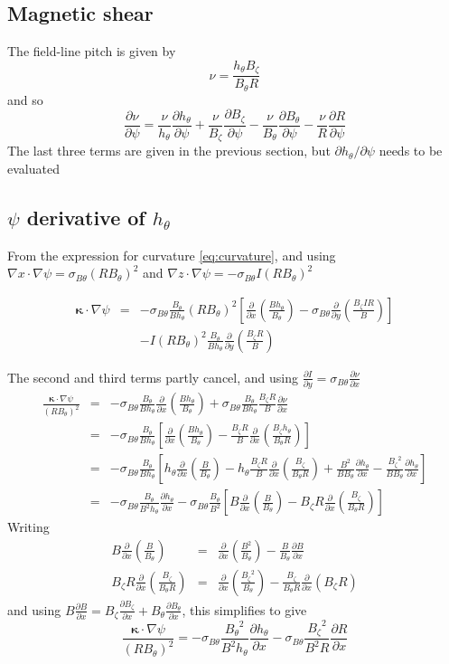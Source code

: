 \documentclass[12pt, a4paper]{article}
\newcommand{\deriv}[2]{\ensuremath{\frac{\partial #1}{\partial #2}}}
\newcommand{\hthe}{\ensuremath{h_\theta}}
\newcommand{\Bp}{\ensuremath{B_\theta}}
\newcommand{\Bt}{\ensuremath{B_\zeta}}
\newcommand{\Vec}[1]{\ensuremath{\mathbf{#1}}}
\newcommand{\kvec}{\Vec{\kappa}}
\newcommand{\rbp}{\ensuremath{R\Bp}}
\newcommand{\rbpsq}{\ensuremath{\left(\rbp\right)^2}}
\newcommand{\sbp}{\ensuremath{\sigma_{B\theta}}}
\begin{document}
\subsection{Magnetic shear}

The field-line pitch is given by
\[
\nu = \frac{\hthe\Bt}{\Bp R}
\]
and so
\[
\deriv{\nu}{\psi} = \frac{\nu}{\hthe}\deriv{\hthe}{\psi} + \frac{\nu}{\Bt}\deriv{\Bt}{\psi} - \frac{\nu}{\Bp}\deriv{\Bp}{\psi} - \frac{\nu}{R}\deriv{R}{\psi}
\]
The last three terms are given in the previous section, but $\partial\hthe/\partial\psi$ needs to be evaluated

\subsection{$\psi$ derivative of $\hthe$}

From the expression for curvature \ref{eq:curvature}, and using $\nabla x \cdot \nabla \psi = \sbp \left(R\Bp\right)^2$ and $\nabla z\cdot\nabla \psi = -\sbp I \left(R\Bp\right)^2$

\begin{eqnarray*}
\kvec\cdot\nabla\psi &=& -\sbp \frac{\Bp}{B\hthe}\rbpsq\left[\deriv{}{x}\left(\frac{B\hthe}{\Bp}\right) - \sbp\deriv{}{y}\left(\frac{\Bt IR}{B}\right)\right] \\
&&- I\rbpsq \frac{\Bp}{B\hthe}\deriv{}{y}\left(\frac{\Bt R}{B}\right)
\end{eqnarray*}

The second and third terms partly cancel, and using $\deriv{I}{y} = \sbp \deriv{\nu}{x}$
\begin{eqnarray*}
  \frac{\kvec\cdot\nabla\psi}{\rbpsq} &=& -\sbp\frac{\Bp}{B\hthe}\deriv{}{x}\left(\frac{B\hthe}{\Bp}\right) + \sbp\frac{\Bp}{B\hthe}\frac{\Bt R}{B}\deriv{\nu}{x} \\
  &=& -\sbp\frac{\Bp}{B\hthe}\left[\deriv{}{x}\left(\frac{B\hthe}{\Bp}\right) - \frac{\Bt R}{B}\deriv{}{x}\left(\frac{\Bt\hthe}{\Bp R}\right)\right] \\
  &=& -\sbp\frac{\Bp}{B\hthe}\left[\hthe\deriv{}{x}\left(\frac{B}{\Bp}\right) - \hthe\frac{\Bt R}{B}\deriv{}{x}\left(\frac{\Bt}{\Bp R}\right) + \frac{B^2}{B\Bp}\deriv{\hthe}{x} - \frac{\Bt^2}{B\Bp}\deriv{\hthe}{x}\right] \\
  &=& -\sbp \frac{\Bp}{B^2\hthe}\deriv{\hthe}{x} - \sbp\frac{\Bp}{B^2}\left[B\deriv{}{x}\left(\frac{B}{\Bp}\right) - \Bt R\deriv{}{x}\left(\frac{\Bt}{\Bp R}\right)\right]
\end{eqnarray*}
Writing
\begin{eqnarray*}
B\deriv{}{x}\left(\frac{B}{\Bp}\right) &=& \deriv{}{x}\left(\frac{B^2}{\Bp}\right) - \frac{B}{\Bp}\deriv{B}{x} \\
\Bt R\deriv{}{x}\left(\frac{\Bt}{\Bp R}\right) &=& \deriv{}{x}\left(\frac{\Bt^2}{\Bp}\right) - \frac{\Bt}{\Bp R}\deriv{}{x}\left(\Bt R\right)
\end{eqnarray*}
and using $B\deriv{B}{x} = \Bt\deriv{\Bt}{x} + \Bp\deriv{\Bp}{x}$, this simplifies to give
\begin{equation}
\frac{\kvec\cdot\nabla\psi}{\rbpsq} = -\sbp\frac{\Bp^2}{B^2\hthe}\deriv{\hthe}{x} - \sbp\frac{\Bt^2}{B^2 R}\deriv{R}{x}
\label{eq:dhdpsi}
\end{equation}
\end{document}
